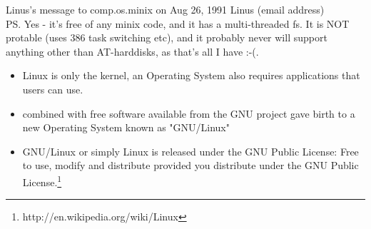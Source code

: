 \documentclass[10pt,t]{beamer}
\begin{document}
{\begin{exampleblock}{Linus's message to comp.os.minix on Aug 26, 1991}
{Linus (email address)\\
PS.  Yes - it's free of any minix code, and it has a multi-threaded fs. It is NOT protable (uses 386 task switching etc), and it probably never will support anything other than AT-harddisks, as that's all I have :-(.\\
}
            {\fontsize{5}{7}}
      \end{exampleblock}
	  \begin{itemize}
    \item Linux is only the kernel, an Operating System also requires applications that users can use.
    \item combined with free software available from the GNU project gave birth to a new Operating System known as "GNU/Linux"
    \item GNU/Linux or simply Linux is released under the GNU Public License: Free to use, modify and distribute provided you distribute under the GNU Public License.\let\thefootnote\relax\footnote{\tiny http://en.wikipedia.org/wiki/Linux}
  \end{itemize}
  }
\end{document}
